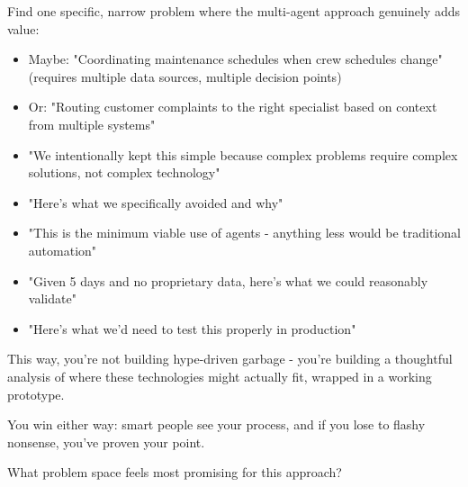  Find one specific, narrow problem where the multi-agent approach genuinely adds value:

\begin{itemize}
\item Maybe: "Coordinating maintenance schedules when crew schedules change" (requires multiple data sources, multiple decision points)
\end{itemize}
\begin{itemize}
\item Or: "Routing customer complaints to the right specialist based on context from multiple systems"
\end{itemize}


\begin{itemize}
\item "We intentionally kept this simple because complex problems require complex solutions, not complex technology"
\end{itemize}
\begin{itemize}
\item "Here's what we specifically avoided and why"
\end{itemize}
\begin{itemize}
\item "This is the minimum viable use of agents - anything less would be traditional automation"
\end{itemize}


\begin{itemize}
\item "Given 5 days and no proprietary data, here's what we could reasonably validate"
\end{itemize}
\begin{itemize}
\item "Here's what we'd need to test this properly in production"
\end{itemize}

This way, you're not building hype-driven garbage - you're building a thoughtful analysis of where these technologies might actually fit, wrapped in a working prototype.

You win either way: smart people see your process, and if you lose to flashy nonsense, you've proven your point.

What problem space feels most promising for this approach?

